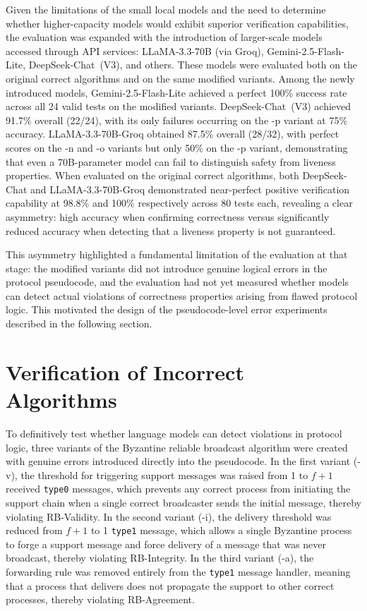 Given the limitations of the small local models and the need to determine whether higher-capacity models would exhibit superior verification capabilities, the evaluation was expanded with the introduction of larger-scale models accessed through API services: LLaMA-3.3-70B (via Groq), Gemini-2.5-Flash-Lite, DeepSeek-Chat~(V3), and others. These models were evaluated both on the original correct algorithms and on the same modified variants. Among the newly introduced models, Gemini-2.5-Flash-Lite achieved a perfect 100\% success rate across all 24 valid tests on the modified variants. DeepSeek-Chat~(V3) achieved 91.7\% overall (22/24), with its only failures occurring on the -p variant at 75\% accuracy. LLaMA-3.3-70B-Groq obtained 87.5\% overall (28/32), with perfect scores on the -n and -o variants but only 50\% on the -p variant, demonstrating that even a 70B-parameter model can fail to distinguish safety from liveness properties. When evaluated on the original correct algorithms, both DeepSeek-Chat and LLaMA-3.3-70B-Groq demonstrated near-perfect positive verification capability at 98.8\% and 100\% respectively across 80 tests each, revealing a clear asymmetry: high accuracy when confirming correctness versus significantly reduced accuracy when detecting that a liveness property is not guaranteed.

This asymmetry highlighted a fundamental limitation of the evaluation at that stage: the modified variants did not introduce genuine logical errors in the protocol pseudocode, and the evaluation had not yet measured whether models can detect actual violations of correctness properties arising from flawed protocol logic. This motivated the design of the pseudocode-level error experiments described in the following section.

\section{Verification of Incorrect Algorithms}

To definitively test whether language models can detect violations in protocol logic, three variants of the Byzantine reliable broadcast algorithm were created with genuine errors introduced directly into the pseudocode. In the first variant (-v), the threshold for triggering support messages was raised from 1 to $f+1$ received \texttt{type0} messages, which prevents any correct process from initiating the support chain when a single correct broadcaster sends the initial message, thereby violating RB-Validity. In the second variant (-i), the delivery threshold was reduced from $f+1$ to 1 \texttt{type1} message, which allows a single Byzantine process to forge a support message and force delivery of a message that was never broadcast, thereby violating RB-Integrity. In the third variant (-a), the forwarding rule was removed entirely from the \texttt{type1} message handler, meaning that a process that delivers does not propagate the support to other correct processes, thereby violating RB-Agreement.

